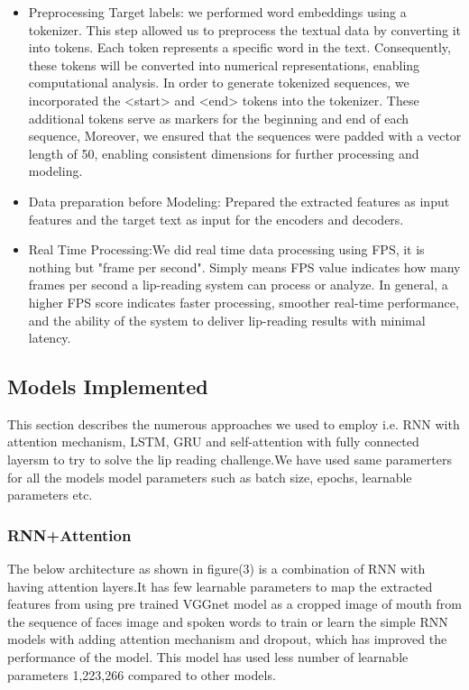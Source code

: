 \documentclass[conference]{IEEEtran}
\begin{document}
\begin{itemize}
\item Preprocessing Target labels: we performed word embeddings using a tokenizer. This step allowed us to preprocess the textual data by converting it into tokens. Each token represents a specific word in the text. Consequently, these tokens will be converted into numerical representations, enabling computational analysis.
In order to generate tokenized sequences, we incorporated the <start> and <end> tokens into the tokenizer. These additional tokens serve as markers for the beginning and end of each sequence, Moreover, we ensured that the sequences were padded with a vector length of 50, enabling consistent dimensions for further processing and modeling.

\item Data preparation before Modeling: Prepared the extracted features as input features and the target text as input for the encoders and decoders.
\item Real Time Processing:We did real time data processing using FPS, it is nothing but "frame per second". Simply means FPS value indicates how many frames per second a lip-reading system can process or analyze. In general, a higher FPS score indicates faster processing, smoother real-time performance, and the ability of the system to deliver lip-reading results with minimal latency. 

\end{itemize}

\subsection{Models Implemented}
This section describes the numerous approaches we used to employ i.e. RNN with attention mechanism, LSTM, GRU and self-attention with fully connected layersm to try to solve the lip reading challenge.We have used same paramerters for all the models model parameters such as  batch size, epochs, learnable parameters etc.  
\subsubsection{RNN+Attention}
The below architecture as shown in figure(3) is a combination of RNN with having attention layers.It has few learnable parameters to map the extracted features from using pre trained VGGnet model as a cropped image of mouth from the sequence of faces image and spoken words to train or learn the simple RNN models with adding attention mechanism and dropout, which has improved the performance of the model. This model has used less number of learnable parameters 1,223,266 compared to other models.
\end{document}

